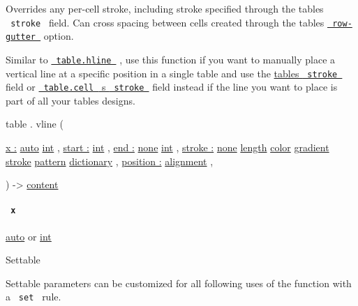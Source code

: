 Overrides any per-cell stroke, including stroke specified through the
table\textquotesingle s \texttt{\ stroke\ } field. Can cross spacing
between cells created through the table\textquotesingle s
\href{/docs/reference/model/table/\#parameters-row-gutter}{\texttt{\ row-gutter\ }}
option.

Similar to
\href{/docs/reference/model/table/\#definitions-hline}{\texttt{\ table.hline\ }}
, use this function if you want to manually place a vertical line at a
specific position in a single table and use the
\href{/docs/reference/model/table/\#parameters-stroke}{table\textquotesingle s
\texttt{\ stroke\ }} field or
\href{/docs/reference/model/table/\#definitions-cell-stroke}{\texttt{\ table.cell\ }
\textquotesingle s \texttt{\ stroke\ }} field instead if the line you
want to place is part of all your tables\textquotesingle{} designs.

table { . } { vline } (

{ \hyperref[definitions-vline-parameters-x]{x :}
\href{/docs/reference/foundations/auto/}{auto}
\href{/docs/reference/foundations/int/}{int} , } {
\hyperref[definitions-vline-parameters-start]{start :}
\href{/docs/reference/foundations/int/}{int} , } {
\hyperref[definitions-vline-parameters-end]{end :}
\href{/docs/reference/foundations/none/}{none}
\href{/docs/reference/foundations/int/}{int} , } {
\hyperref[definitions-vline-parameters-stroke]{stroke :}
\href{/docs/reference/foundations/none/}{none}
\href{/docs/reference/layout/length/}{length}
\href{/docs/reference/visualize/color/}{color}
\href{/docs/reference/visualize/gradient/}{gradient}
\href{/docs/reference/visualize/stroke/}{stroke}
\href{/docs/reference/visualize/pattern/}{pattern}
\href{/docs/reference/foundations/dictionary/}{dictionary} , } {
\hyperref[definitions-vline-parameters-position]{position :}
\href{/docs/reference/layout/alignment/}{alignment} , }

) -\textgreater{} \href{/docs/reference/foundations/content/}{content}

\paragraph{\texorpdfstring{\texttt{\ x\ }}{ x }}\label{definitions-vline-x}

\href{/docs/reference/foundations/auto/}{auto} {or}
\href{/docs/reference/foundations/int/}{int}

{{ Settable }}

\label{definitions-vline-x-settable-tooltip}
Settable parameters can be customized for all following uses of the
function with a \texttt{\ set\ } rule.

